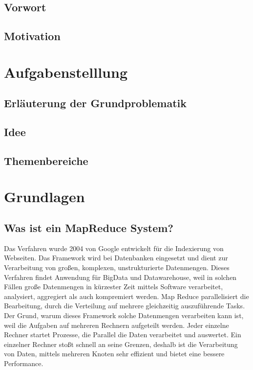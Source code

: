 \documentclass[a4paper,12pt]{article}
\begin{document}
\subsection{Vorwort}

\subsection{Motivation}

\section{Aufgabenstelllung}

\subsection{Erläuterung der Grundproblematik}

\subsection{Idee}

\subsection{Themenbereiche}

\section{Grundlagen}

\subsection{Was ist ein MapReduce System?}
Das Verfahren wurde 2004 von Google entwickelt für die Indexierung von Webseiten. Das Framework wird bei Datenbanken eingesetzt und dient zur Verarbeitung von großen, komplexen, unstrukturierte Datenmengen.
Dieses Verfahren findet Anwendung für BigData und Datawarehouse, weil in solchen Fällen große Datenmengen in kürzester Zeit mittels Software verarbeitet, analysiert, aggregiert als auch kompremiert werden. 
Map Reduce parallelisiert die Bearbeitung, durch die Verteilung auf mehrere gleichzeitig auszuführende Tasks. Der Grund, warum dieses Framework solche Datenmengen verarbeiten kann ist, weil die Aufgaben auf mehreren Rechnern aufgeteilt werden. Jeder einzelne Rechner startet Prozesse, die Parallel die Daten verarbeitet und auswertet.
Ein einzelner Rechner stoßt schnell an seine Grenzen, deshalb ist die Verarbeitung von Daten, mittels mehreren Knoten sehr effizient und bietet eine bessere Performance.
\end{document}
